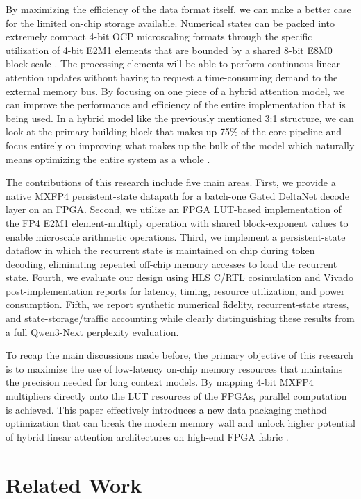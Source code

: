 ﻿\documentclass[conference]{IEEEtran}
\begin{document}
By maximizing the efficiency of the data format itself, we can make a better case for the limited on-chip storage available. Numerical states can be packed into extremely compact 4-bit OCP microscaling formats through the specific utilization of 4-bit E2M1 elements that are bounded by a shared 8-bit E8M0 block scale \cite{b12}. The processing elements will be able to perform continuous linear attention updates without having to request a time-consuming demand to the external memory bus. By focusing on one piece of a hybrid attention model, we can improve the performance and efficiency of the entire implementation that is being used. In a hybrid model like the previously mentioned 3:1 structure, we can look at the primary building block that makes up 75\% of the core pipeline and focus entirely on improving what makes up the bulk of the model which naturally means optimizing the entire system as a whole \cite{b9}.

The contributions of this research include five main areas. First, we provide a native MXFP4 persistent-state datapath for a batch-one Gated DeltaNet decode layer on an FPGA. Second, we utilize an FPGA LUT-based implementation of the FP4 E2M1 element-multiply operation with shared block-exponent values to enable microscale arithmetic operations. Third, we implement a persistent-state dataflow in which the recurrent state is maintained on chip during token decoding, eliminating repeated off-chip memory accesses to load the recurrent state. Fourth, we evaluate our design using HLS C/RTL cosimulation and Vivado post-implementation reports for latency, timing, resource utilization, and power consumption. Fifth, we report synthetic numerical fidelity, recurrent-state stress, and state-storage/traffic accounting while clearly distinguishing these results from a full Qwen3-Next perplexity evaluation.

To recap the main discussions made before, the primary objective of this research is to maximize the use of low-latency on-chip memory resources that maintains the precision needed for long context models. By mapping 4-bit MXFP4 multipliers directly onto the LUT resources of the FPGAs, parallel computation is achieved. This paper effectively introduces a new data packaging method optimization that can break the modern memory wall and unlock higher potential of hybrid linear attention architectures on high-end FPGA fabric \cite{b5}.

\section{Related Work}
\end{document}
